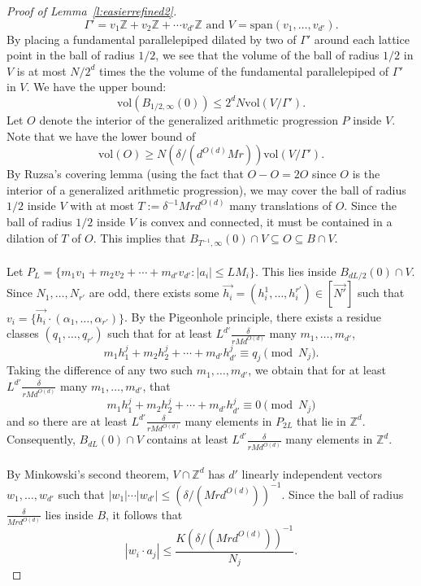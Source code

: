 \documentclass[11pt, a4paper]{amsart}
\theoremstyle{plain}
\theoremstyle{plain}
\theoremstyle{definition}
\theoremstyle{remark}
\numberwithin{equation}{section}
\numberwithin{lemma}{section}
\numberwithin{proposition}{section}
\numberwithin{corollary}{section}
\numberwithin{definition}{section}
\numberwithin{claim}{section}
\begin{document}
\begin{proof}[Proof of Lemma~\ref{l:easierrefined2}]
$$\Gamma' = v_1\mathbb{Z} + v_2\mathbb{Z} + \cdots v_{d'}\mathbb{Z} \text{ and } V = \text{span}(v_1, \dots, v_{d'}).$$
By placing a fundamental parallelepiped dilated by two of $\Gamma'$ around each lattice point in the ball of radius $1/2$, we see that the volume of the ball of radius $1/2$ in $V$ is at most $N/2^d$ times the the volume of the fundamental parallelepiped of $\Gamma'$ in $V$. We have the upper bound:
$$\mathrm{vol}(B_{1/2, \infty}(0)) \le 2^dN\mathrm{vol}(V/\Gamma').$$
Let $O$ denote the interior of the generalized arithmetic progression $P$ inside $V$. Note that we have the lower bound of
$$\mathrm{vol}(O) \ge N(\delta/(d^{O(d)}Mr)) \mathrm{vol}(V/\Gamma').$$
By Ruzsa's covering lemma (using the fact that $O - O = 2O$ since $O$ is the interior of a generalized arithmetic progression), we may cover the ball of radius $1/2$ inside $V$ with at most $T := \delta^{-1}Mrd^{O(d)}$ many translations of $O$. Since the ball of radius $1/2$ inside $V$ is convex and connected, it must be contained in a dilation of $T$ of $O$. This implies that $B_{T^{-1}, \infty}(0) \cap V \subseteq O \subseteq B\cap V$. \\\\
Let $P_L = \{m_1v_1 + m_2v_2 + \cdots + m_{d'} v_{d'}: |a_i| \le LM_i\}$. This lies inside $B_{dL/2}(0) \cap V$. Since $N_1, \dots, N_{r'}$ are odd, there exists some $\vec{h_i} = (h_i^1, \dots, h_i^{r'}) \in [\vec{N'}]$ such that $v_i = \{\vec{h_i} \cdot (\alpha_1, \dots, \alpha_{r'})\}$. By the Pigeonhole principle, there exists a residue classes $(q_1, \dots, q_{r'})$ such that for at least $L^{d'}\frac{\delta}{rMd^{O(d)}}$ many $m_1, \dots, m_{d'}$,
$$m_1h_1^j + m_2h_2^j + \cdots + m_{d'} h_{d'}^j \equiv q_j \pmod{N_j}.$$
Taking the difference of any two such $m_1, \dots, m_{d'}$, we obtain that for at least $L^{d'}\frac{\delta}{rMd^{O(d)}}$ many $m_1, \dots, m_{d'}$, that
$$m_1h_1^j + m_2h_2^j + \cdots + m_{d'} h_{d'}^j \equiv 0 \pmod{N_j}$$
and so there are at least $L^{d'}\frac{\delta}{rMd^{O(d)}}$ many elements in $P_{2L}$ that lie in $\mathbb{Z}^{d}$. Consequently, $B_{dL}(0) \cap V$ contains at least $L^{d'}\frac{\delta}{rMd^{O(d)}}$ many elements in $\mathbb{Z}^d$. \\\\
By Minkowski's second theorem, $V \cap \mathbb{Z}^{d}$ has $d'$ linearly independent vectors $w_1, \dots, w_{d'}$ such that $|w_1| \cdots |w_{d'}| \le (\delta/(Mrd^{O(d)}))^{-1}$. Since the ball of radius $\frac{\delta}{Mrd^{O(d)}}$ lies inside $B$, it follows that
$$|w_i \cdot a_j| \le \frac{K(\delta/(Mrd^{O(d)}))^{-1}}{N_j}.$$

\end{proof}
\end{document}
